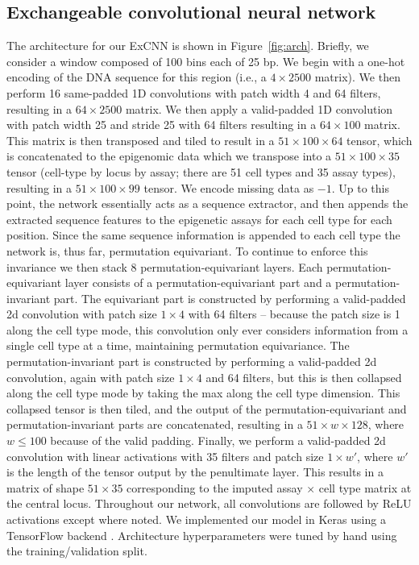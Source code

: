 \documentclass[11pt]{article}
\begin{document}
\subsection{Exchangeable convolutional neural network}
\label{sec:excnn}
The architecture for our ExCNN is shown in Figure~\ref{fig:arch}. Briefly, we consider a window composed of 100 bins each of 25 bp. We begin with a one-hot encoding of the DNA sequence for this region (i.e., a $4 \times 2500$ matrix). We then perform 16 same-padded 1D convolutions with patch width 4 and 64 filters, resulting in a $64 \times 2500$ matrix. We then apply a valid-padded 1D convolution with patch width 25 and stride 25 with 64 filters resulting in a $64 \times 100$ matrix. This matrix is then transposed and tiled to result in a $51 \times 100 \times 64$ tensor, which is concatenated to the epigenomic data which we transpose into a $51 \times 100 \times 35$ tensor (cell-type by locus by assay; there are 51 cell types and 35 assay types), resulting in a $51 \times 100 \times 99$ tensor. We encode missing data as $-1$. Up to this point, the network essentially acts as a sequence extractor, and then appends the extracted sequence features to the epigenetic assays for each cell type for each position. Since the same sequence information is appended to each cell type the network is, thus far, permutation equivariant. To continue to enforce this invariance we then stack 8 permutation-equivariant layers. Each permutation-equivariant layer consists of a permutation-equivariant part and a permutation-invariant part. The equivariant part is constructed by performing a valid-padded 2d convolution with patch size $1 \times 4$ with 64 filters -- because the patch size is 1 along the cell type mode, this convolution only ever considers information from a single cell type at a time, maintaining permutation equivariance. The permutation-invariant part is constructed by performing a valid-padded 2d convolution, again with patch size $1 \times 4$ and 64 filters, but this is then collapsed along the cell type mode by taking the max along the cell type dimension. This collapsed tensor is then tiled, and the output of the permutation-equivariant and permutation-invariant parts are concatenated, resulting in a $51 \times w \times 128$, where $w \le 100$ because of the valid padding. Finally, we perform a valid-padded 2d convolution with linear activations with 35 filters and patch size $1 \times w'$, where $w'$ is the length of the tensor output by the penultimate layer. This results in a matrix of shape $51 \times 35$ corresponding to the imputed assay $\times$ cell type matrix at the central locus. Throughout our network, all convolutions are followed by ReLU activations except where noted. We implemented our model in Keras \cite{chollet2015keras} using a TensorFlow backend \cite{abadi2015tensorflow}. Architecture hyperparameters were tuned by hand using the training/validation split.
\end{document}
